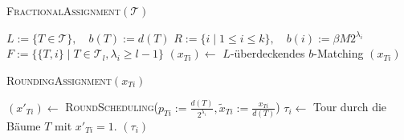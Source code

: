 \documentclass[a4paper,ngerman,12pt,bibtotoc]{scrartcl}
\theoremstyle{definition}
\theoremstyle{plain}
\theoremstyle{remark}
\newcommand{\Tc}{\mathcal{T}}
\begin{document}
\begin{minipage}{0.5\textwidth}
		\begin{algorithm}[H]\footnotesize
			\caption{\small \textsc{FractionalAssignment}$\left(\Tc\right)$}\label{AlgFractionalAssignment}
			\begin{algorithmic}[1]
				\State $L := \{T \in \Tc\},\quad b(T) := d(T)$
				\State $R := \{i \mid 1\leq i \leq k\},\quad b(i) := \beta M 2^{\lambda_i}$
				\State $F := \{\{T,i\} \mid T \in \Tc_l, \lambda_i \geq l-1\}$ 
				\State $\left(x_{Ti}\right) \gets$ $L$-überdeckendes $b$-Matching
				\State \Return $\left(x_{Ti}\right)$
			\end{algorithmic}
		\end{algorithm}
		
		\begin{algorithm}[H]\footnotesize
			\caption{\small \textsc{RoundingAssignment}$\left(x_{Ti}\right)$}\label{AlgRoundingAssignment}
			\begin{algorithmic}[1]
				\State $\left(x'_{Ti}\right) \gets$ \textsc{RoundScheduling}($p_{Ti} := \frac{d(T)}{2^{\lambda_i}}, \tilde{x}_{Ti} := \frac{x_{Ti}}{d(T)}$)
				\State $\tau_i \gets$ Tour durch die Bäume $T$ mit $x'_{Ti} = 1$.
				\State \Return $\left(\tau_i\right)$
			\end{algorithmic}
		\end{algorithm}								
	\end{minipage}
	\begin{minipage}{0.05\textwidth}
		\phantom{Hallo}
	\end{minipage}
\end{document}
